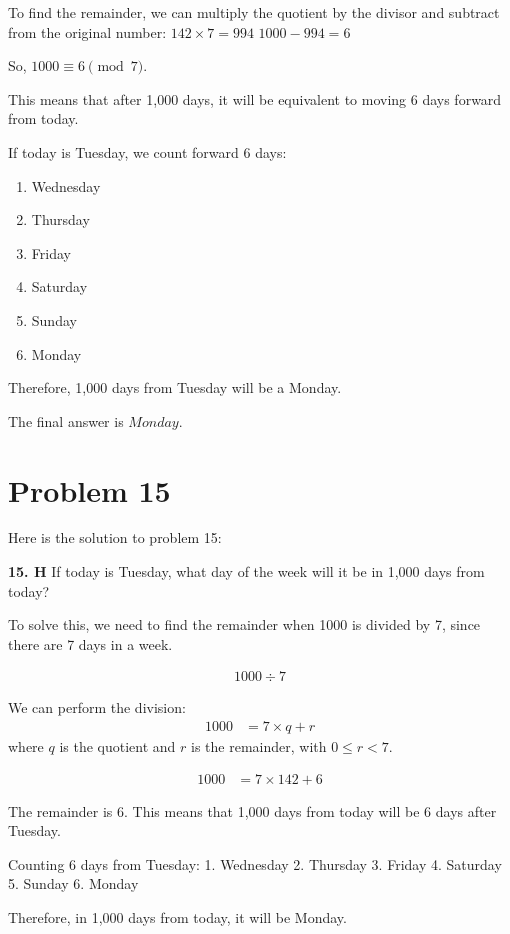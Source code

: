 \documentclass{article}
\begin{document}
To find the remainder, we can multiply the quotient by the divisor and subtract from the original number:
$142 \times 7 = 994$
$1000 - 994 = 6$

So, $1000 \equiv 6 \pmod{7}$.

This means that after 1,000 days, it will be equivalent to moving 6 days forward from today.

If today is Tuesday, we count forward 6 days:
\begin{enumerate}
    \item Wednesday
    \item Thursday
    \item Friday
    \item Saturday
    \item Sunday
    \item Monday
\end{enumerate}

Therefore, 1,000 days from Tuesday will be a Monday.

The final answer is $\boxed{Monday}$.

\newpage

\section*{\textbf{Problem 15}}
Here is the solution to problem 15:

\textbf{15. H} If today is Tuesday, what day of the week will it be in 1,000 days from today?

To solve this, we need to find the remainder when 1000 is divided by 7, since there are 7 days in a week.

\begin{align} 1000 \div 7 \end{align}

We can perform the division:
\begin{align} 1000 &= 7 \times q + r \end{align}
where $q$ is the quotient and $r$ is the remainder, with $0 \le r < 7$.

\begin{align} 1000 &= 7 \times 142 + 6 \end{align}

The remainder is 6. This means that 1,000 days from today will be 6 days after Tuesday.

Counting 6 days from Tuesday:
1. Wednesday
2. Thursday
3. Friday
4. Saturday
5. Sunday
6. Monday

Therefore, in 1,000 days from today, it will be Monday.
\end{document}
